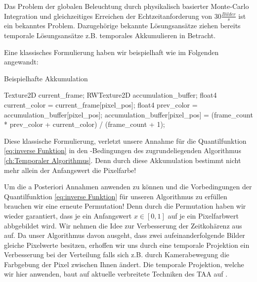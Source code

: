 Das Problem der globalen Beleuchtung durch physikalisch basierter Monte-Carlo Integration und gleichzeitiges Erreichen der 
Echtzeitanforderung von 30$\frac{Bilder}{s}$ ist ein bekanntes Problem. Dazugehörige bekannte Lösungsansätze 
ziehen bereits temporale Lösungsansätze z.B. temporales Akkumulieren \cite{schied2017spatiotemporal} in Betracht. 
\par 

Eine klassisches Formulierung \cite{UE4TAA} haben wir beispielhaft wie im Folgenden angewandt:

\begin{algorithm}[H]
    \caption{Beispielhafte Akkumulation}
    \begin{algorithmic}[1]
        \State Texture2D current\_frame;
        \State RWTexture2D accumulation\_buffer;
        \State float4 current\_color = current\_frame[pixel\_pos];
        \State float4 prev\_color = accumulation\_buffer[pixel\_pos];
        \State accumulation\_buffer[pixel\_pos] = 
        \State (frame\_count * prev\_color + current\_color) / (frame\_count + 1);
    \end{algorithmic}
    \label{alg:TemporalAccumulation}
\end{algorithm}

Diese klassische Formulierung, verletzt unsere Annahme für die Quantilfunktion \ref{eq:inverse Funktion}
in den -Bedingungen des zugrundeliegenden Algorithmus 
\ref{ch:Temporaler Algorithmus}. Denn durch diese Akkumulation bestimmt nicht mehr allein der 
Anfangswert die Pixelfarbe!
\par 

\begin{figure}[H]
    
    \label{subsec:Temporales Projezieren}
\end{figure}
Um die a Posteriori Annahmen anwenden zu können und die Vorbedingungen der Quantilfunktion \ref{eq:inverse Funktion}
für unseren Algorithmus zu erfüllen brauchen wir eine erneute Permutation! Denn durch die Permutation haben wir wieder garantiert, 
dass je ein Anfangswert $x \in [0,1]$ auf je ein Pixelfarbwert abbgebildet wird. Wir nehmen die Idee zur Verbesserung der Zeitkohärenz
aus \cite[S.9/10]{hal02158423} auf. Da unser Algorithmus davon ausgeht, dass zwei aufeinanderfolgende Bilder gleiche Pixelwerte 
besitzen, erhoffen wir uns durch eine temporale Projektion ein Verbesserung bei der  Verteilung 
falls sich z.B. durch Kamerabewegung die Farbgebung der Pixel zwischen Ihnen ändert. Die temporale Projektion, welche wir hier 
anwenden, baut auf aktuelle verbreitete Techniken des TAA auf \cite{INSIDETAA}.

